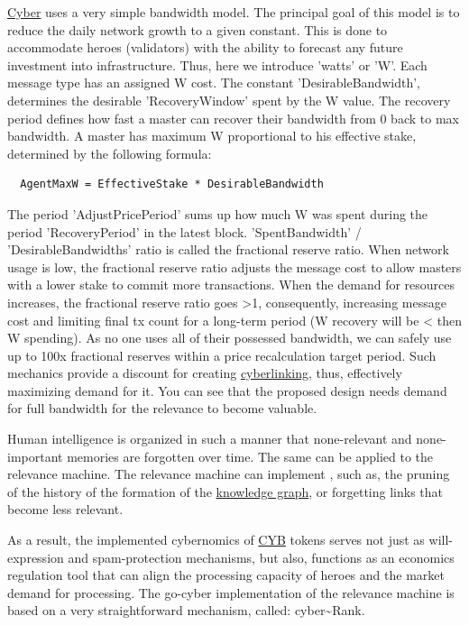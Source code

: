 \documentclass[8pt,oneside]{amsart}
\newcommand{\linkgreen}[2]{\href{#1}{\color{green}{#2}}}
\newcommand{\code}[1]{{\PlayBold #1}}
\begin{document}
{\hyperref[cyber]{Cyber}} uses a very simple bandwidth model. The principal goal of this model is to reduce the daily network growth to a given constant. This is done to accommodate heroes (validators) with the ability to forecast any future investment into infrastructure. Thus, here we introduce 'watts' or 'W'. Each message type has an assigned W cost. The constant 'DesirableBandwidth', determines the desirable 'RecoveryWindow' spent by the W value. The recovery period defines how fast a master can recover their bandwidth from 0 back to max bandwidth. A master has maximum W proportional to his effective stake, determined by the following formula:
\begin{lstlisting}
  AgentMaxW = EffectiveStake * DesirableBandwidth
\end{lstlisting}

The period 'AdjustPricePeriod' sums up how much W was spent during the period 'RecoveryPeriod' in the latest block. 'SpentBandwidth' / 'DesirableBandwidths' ratio is called the fractional reserve ratio. When network usage is low, the fractional reserve ratio adjusts the message cost to allow masters with a lower stake to commit more transactions. When the demand for resources increases, the fractional reserve ratio goes \code{>1}, consequently, increasing message cost and limiting final tx count for a long-term period (W recovery will be \code{<} then W spending). As no one uses all of their possessed bandwidth, we can safely use up to 100x fractional reserves within a price recalculation target period. Such mechanics provide a discount for creating {\hyperref[cyberlinks]{cyberlinking}}, thus, effectively maximizing demand for it. You can see that the proposed design needs demand for full bandwidth for the relevance to become valuable.

Human intelligence is organized in such a manner that none-relevant and none-important memories are forgotten over time. The same can be applied to the relevance machine. The relevance machine can implement \linkgreen{https://ipfs.io/ipfs/QmP81EcuNDZHQutvdcDjbQEqiTYUzU315aYaTyrVj6gtJb}{aggressive pruning strategies}, such as, the pruning of the history of the formation of the {\hyperref[knowledge-graph]{knowledge graph}}, or forgetting links that become less relevant.

As a result, the implemented cybernomics of {\hyperref[cyb]{CYB}} tokens serves not just as will-expression and spam-protection mechanisms, but also, functions as an economics regulation tool that can align the processing capacity of heroes and the market demand for processing. The go-cyber implementation of the relevance machine is based on a very straightforward mechanism, called: cyber\~{}Rank.
\end{document}
